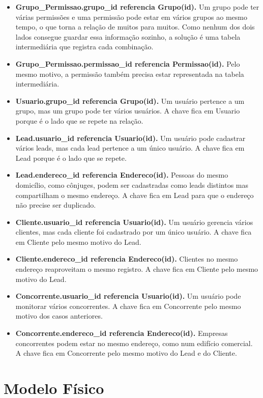 \documentclass[a4paper]{article}
\begin{document}
\begin{itemize}
    \item \textbf{Grupo\_Permissao.grupo\_id referencia Grupo(id).} Um grupo pode ter várias permissões e uma permissão pode estar em vários grupos ao mesmo tempo, o que torna a relação de muitos para muitos. Como nenhum dos dois lados consegue guardar essa informação sozinho, a solução é uma tabela intermediária que registra cada combinação.
    \item \textbf{Grupo\_Permissao.permissao\_id referencia Permissao(id).} Pelo mesmo motivo, a permissão também precisa estar representada na tabela intermediária.
    \item \textbf{Usuario.grupo\_id referencia Grupo(id).} Um usuário pertence a um grupo, mas um grupo pode ter vários usuários. A chave fica em Usuario porque é o lado que se repete na relação.
    \item \textbf{Lead.usuario\_id referencia Usuario(id).} Um usuário pode cadastrar vários leads, mas cada lead pertence a um único usuário. A chave fica em Lead porque é o lado que se repete.
    \item \textbf{Lead.endereco\_id referencia Endereco(id).} Pessoas do mesmo domicílio, como cônjuges, podem ser cadastradas como leads distintos mas compartilham o mesmo endereço. A chave fica em Lead para que o endereço não precise ser duplicado.
    \item \textbf{Cliente.usuario\_id referencia Usuario(id).} Um usuário gerencia vários clientes, mas cada cliente foi cadastrado por um único usuário. A chave fica em Cliente pelo mesmo motivo do Lead.
    \item \textbf{Cliente.endereco\_id referencia Endereco(id).} Clientes no mesmo endereço reaproveitam o mesmo registro. A chave fica em Cliente pelo mesmo motivo do Lead.
    \item \textbf{Concorrente.usuario\_id referencia Usuario(id).} Um usuário pode monitorar vários concorrentes. A chave fica em Concorrente pelo mesmo motivo dos casos anteriores.
    \item \textbf{Concorrente.endereco\_id referencia Endereco(id).} Empresas concorrentes podem estar no mesmo endereço, como num edifício comercial. A chave fica em Concorrente pelo mesmo motivo do Lead e do Cliente.
\end{itemize}

\section{Modelo Físico}
\end{document}
